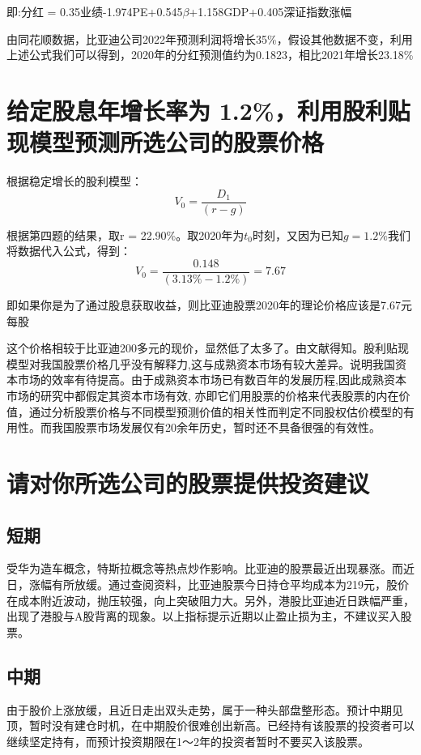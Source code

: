 \documentclass[UTF8]{ctexart}
\begin{document}
即:分红 = 0.35业绩-1.974PE+0.545$\beta$+1.158GDP+0.405深证指数涨幅\par
由同花顺数据，比亚迪公司2022年预测利润将增长35\%，假设其他数据不变，利用上述公式我们可以得到，2020年的分红预测值约为0.1823，相比2021年增长23.18\%
\section{ 给定股息年增长率为 1.2\%，利用股利贴现模型预测所选公司的股票价格}
根据稳定增长的股利模型：
$$V_{0} = \frac{D_{1}}{(r-g)}$$\par
根据第四题的结果，取r = 22.90\%。取2020年为$t_{0}$时刻，又因为已知$g = 1.2\%$我们将数据代入公式，得到：
$$V_{0} = \frac{0.148}{(3.13\%-1.2\%)} = 7.67$$\par
即如果你是为了通过股息获取收益，则比亚迪股票2020年的理论价格应该是7.67元每股\par
这个价格相较于比亚迪200多元的现价，显然低了太多了。由文献得知\cite{ref7}。股利贴现模型对我国股票价格几乎没有解释力,这与成熟资本市场有较大差异。说明我国资本市场的效率有待提高。由于成熟资本市场已有数百年的发展历程,因此成熟资本市场的研究中都假定其资本市场有效, 亦即它们用股票的价格来代表股票的内在价值，通过分析股票价格与不同模型预测价值的相关性而判定不同股权估价模型的有用性。而我国股票市场发展仅有20余年历史，暂时还不具备很强的有效性。
\section{请对你所选公司的股票提供投资建议}
\subsection{短期}
受华为造车概念，特斯拉概念等热点炒作影响。比亚迪的股票最近出现暴涨。而近日，涨幅有所放缓。通过查阅资料，比亚迪股票今日持仓平均成本为219元，股价在成本附近波动，抛压较强，向上突破阻力大。另外，港股比亚迪近日跌幅严重，出现了港股与A股背离的现象。以上指标提示近期以止盈止损为主，不建议买入股票。
\subsection{中期}
由于股价上涨放缓，且近日走出双头走势，属于一种头部盘整形态。预计中期见顶，暂时没有建仓时机，在中期股价很难创出新高。已经持有该股票的投资者可以继续坚定持有，而预计投资期限在1～2年的投资者暂时不要买入该股票。
\end{document}
